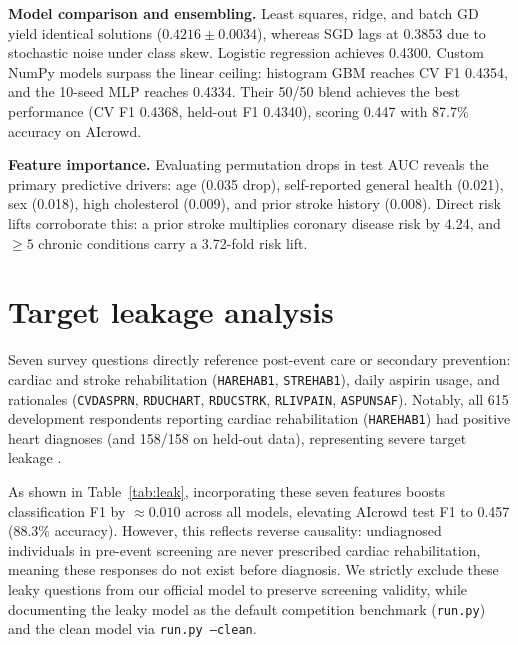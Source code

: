 \documentclass[10pt,conference,compsocconf]{IEEEtran}
\begin{document}
\textbf{Model comparison and ensembling.} Least squares, ridge, and batch GD yield identical solutions ($0.4216 \pm 0.0034$), whereas SGD lags at 0.3853 due to stochastic noise under class skew. Logistic regression achieves 0.4300. Custom NumPy models surpass the linear ceiling: histogram GBM reaches CV F1 0.4354, and the 10-seed MLP reaches 0.4334. Their 50/50 blend achieves the best performance (CV F1 0.4368, held-out F1 0.4340), scoring 0.447 with 87.7\% accuracy on AIcrowd.

\textbf{Feature importance.} Evaluating permutation drops in test AUC \cite{fawcett2006roc} reveals the primary predictive drivers: age (0.035 drop), self-reported general health (0.021), sex (0.018), high cholesterol (0.009), and prior stroke history (0.008). Direct risk lifts corroborate this: a prior stroke multiplies coronary disease risk by 4.24, and $\ge 5$ chronic conditions carry a 3.72-fold risk lift.

\section{Target leakage analysis}
\label{sec:leakage}
Seven survey questions directly reference post-event care or secondary prevention: cardiac and stroke rehabilitation (\texttt{HAREHAB1}, \texttt{STREHAB1}), daily aspirin usage, and rationales (\texttt{CVDASPRN}, \texttt{RDUCHART}, \texttt{RDUCSTRK}, \texttt{RLIVPAIN}, \texttt{ASPUNSAF}). Notably, all 615 development respondents reporting cardiac rehabilitation (\texttt{HAREHAB1}) had positive heart diagnoses (and 158/158 on held-out data), representing severe target leakage \cite{kaufman2012leakage}.

As shown in Table~\ref{tab:leak}, incorporating these seven features boosts classification F1 by $\approx 0.010$ across all models, elevating AIcrowd test F1 to 0.457 (88.3\% accuracy). However, this reflects reverse causality: undiagnosed individuals in pre-event screening are never prescribed cardiac rehabilitation, meaning these responses do not exist before diagnosis. We strictly exclude these leaky questions from our official model to preserve screening validity, while documenting the leaky model as the default competition benchmark (\texttt{run.py}) and the clean model via \texttt{run.py --clean}.
\end{document}
